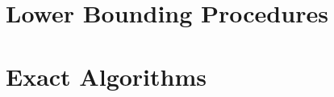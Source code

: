 

\clearpage




\section{Lower Bounding Procedures}
\label{sec:solving:lower}

\section{Exact Algorithms}\label{sec:solving:exact}
